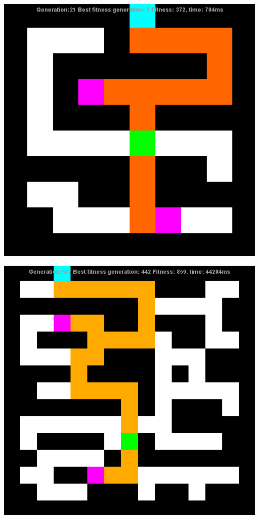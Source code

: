 \documentclass[12pt]{article} %
\begin{document}
\begin{center}
\includegraphics[scale=.6]{maze9}

\includegraphics[scale=.6]{maze10}


\end{center}
\end{document}
